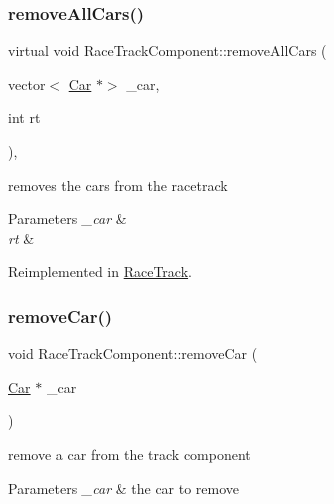 \mbox{\label{class_race_track_component_a0d073a7d844143f5c4cebf2a2bb0cee7}} 
\subsubsection{\texorpdfstring{remove\+All\+Cars()}{removeAllCars()}}
{\footnotesize\ttfamily virtual void Race\+Track\+Component\+::remove\+All\+Cars (\begin{DoxyParamCaption}\item[{vector$<$ \mbox{\hyperlink{class_car}{Car}} $\ast$$>$}]{\+\_\+car,  }\item[{int}]{rt }\end{DoxyParamCaption})\hspace{0.3cm}{\ttfamily [inline]}, {\ttfamily [virtual]}}

removes the cars from the racetrack 
\begin{DoxyParams}{Parameters}
{\em \+\_\+car} & \\
\hline
{\em rt} & \\
\hline
\end{DoxyParams}


Reimplemented in \mbox{\hyperlink{class_race_track_a4b710e5c818fa6ac2c4701cbee3e8cd3}{Race\+Track}}.

\mbox{\label{class_race_track_component_a68594f9436ad820a62430d59ae433273}} 
\subsubsection{\texorpdfstring{remove\+Car()}{removeCar()}}
{\footnotesize\ttfamily void Race\+Track\+Component\+::remove\+Car (\begin{DoxyParamCaption}\item[{\mbox{\hyperlink{class_car}{Car}} $\ast$}]{\+\_\+car }\end{DoxyParamCaption})\hspace{0.3cm}{\ttfamily [inline]}}

remove a car from the track component 
\begin{DoxyParams}{Parameters}
{\em \+\_\+car} & the car to remove \\
\hline
\end{DoxyParams}
\mbox{\label{class_race_track_component_a03d5e6e6758dcf89bee2f4160d18a9eb}} 
